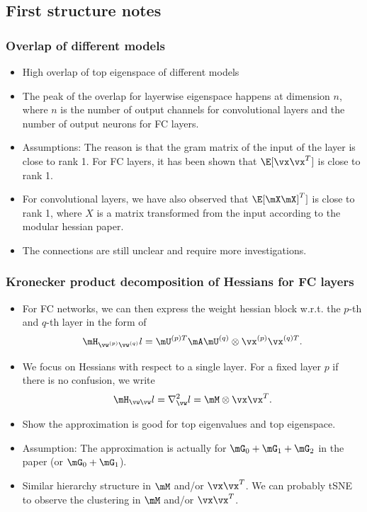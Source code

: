 \subsection{First structure notes}
\subsubsection{Overlap of different models}
\begin{itemize}
    \item High overlap of top eigenspace of different models
    \item The peak of the overlap for layerwise eigenspace happens at dimension $n$, where $n$ is the number of output channels for convolutional layers and the number of output neurons for FC layers.
    \item Assumptions: The reason is that the gram matrix of the input of the layer is close to rank 1. For FC layers, it has been shown that $\E[\vx \vx^T]$ is close to rank 1.
    \item For convolutional layers, we have also observed that $\E[\mX \mX]^T]$ is close to rank 1, where $X$ is a matrix transformed from the input according to the modular hessian paper.
    \item The connections are still unclear and require more investigations.
\end{itemize}

\subsubsection{Kronecker product decomposition of Hessians for FC layers}
\begin{itemize}
    \item For FC networks, we can then express the weight hessian block w.r.t. the $p$-th and $q$-th layer in the form of $$\mH_{\vw^{(p)}\vw^{(q)}} l = \mU^{(p)T}\mA\mU^{(q)} \otimes \vx^{(p)}\vx^{(q)T}.$$
    \item We focus on Hessians with respect to a single layer. For a fixed layer $p$ if there is no confusion, we write
    $$\mH_{\vw\vw} l = \nabla_\vw^2 l = \mM \otimes \vx\vx^T.$$
    \item Show the approximation is good for top eigenvalues and top eigenspace.
    \item Assumption: The approximation is actually for $\mG_0+\mG_1+\mG_2$ in the paper (or $\mG_0+\mG_1$).
    \item Similar hierarchy structure in $\mM$ and/or $\vx\vx^T$. We can probably tSNE to observe the clustering in $\mM$ and/or $\vx\vx^T$.
\end{itemize}


